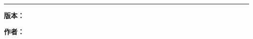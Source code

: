 \begin{titlepage}
    \begin{flushright}
        \vspace*{80pt}

        {\Huge \thetitle}
        \vspace{10pt}

        \rule{0.8\textwidth}{2pt}
        \vspace{60pt}

        \parbox{0.3\textwidth}{
            {\large \textbf{版本：}\theversion}
            \vspace{10pt}

            {\large \textbf{作者：}\theauthor}
        }
    \end{flushright}
    \clearpage
\end{titlepage}

